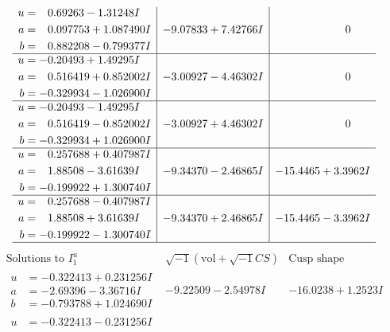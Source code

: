 \documentclass[1p]{elsarticle_modified}
\theoremstyle{definition}
\newcommand{\I}{\sqrt{-1}}
\begin{document}
$$\begin{array}{c|c|c}
\begin{aligned}
u &= \phantom{-}0.69263 - 1.31248 I \\
a &= \phantom{-}0.097753 + 1.087490 I \\
b &= \phantom{-}0.882208 - 0.799377 I\end{aligned}
 & -9.07833 + 7.42766 I & \phantom{-0.000000 } 0 \\ \hline\begin{aligned}
u &= -0.20493 + 1.49295 I \\
a &= \phantom{-}0.516419 + 0.852002 I \\
b &= -0.329934 - 1.026900 I\end{aligned}
 & -3.00927 - 4.46302 I & \phantom{-0.000000 } 0 \\ \hline\begin{aligned}
u &= -0.20493 - 1.49295 I \\
a &= \phantom{-}0.516419 - 0.852002 I \\
b &= -0.329934 + 1.026900 I\end{aligned}
 & -3.00927 + 4.46302 I & \phantom{-0.000000 } 0 \\ \hline\begin{aligned}
u &= \phantom{-}0.257688 + 0.407987 I \\
a &= \phantom{-}1.88508 - 3.61639 I \\
b &= -0.199922 + 1.300740 I\end{aligned}
 & -9.34370 - 2.46865 I & -15.4465 + 3.3962 I \\ \hline\begin{aligned}
u &= \phantom{-}0.257688 - 0.407987 I \\
a &= \phantom{-}1.88508 + 3.61639 I \\
b &= -0.199922 - 1.300740 I\end{aligned}
 & -9.34370 + 2.46865 I & -15.4465 - 3.3962 I\\
 \hline 
 \end{array}$$\newpage$$\begin{array}{c|c|c}  
\text{Solutions to }I^u_{1}& \I (\text{vol} + \sqrt{-1}CS) & \text{Cusp shape}\\
 \hline 
\begin{aligned}
u &= -0.322413 + 0.231256 I \\
a &= -2.69396 - 3.36716 I \\
b &= -0.793788 + 1.024690 I\end{aligned}
 & -9.22509 - 2.54978 I & -16.0238 + 1.2523 I \\ \hline\begin{aligned}
u &= -0.322413 - 0.231256 I \\

\end{aligned}
\end{array}$$
\end{document}
